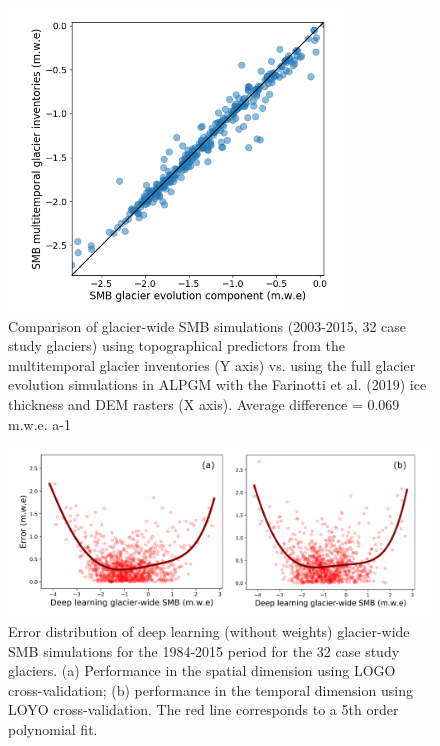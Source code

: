 \begin{figure}[h]
\centering
\includegraphics[width=9cm]{Figures/methods/Figure_S5.png}
\caption{Comparison of glacier-wide SMB simulations (2003-2015, 32 case study glaciers) using topographical predictors from the multitemporal glacier inventories (Y axis) vs. using the full glacier evolution simulations in ALPGM with the Farinotti et al. (2019) ice thickness and DEM rasters (X axis). Average difference = 0.069 m.w.e.  a-1}
\end{figure}

\begin{figure}[h]
\centering
\includegraphics[width=15cm]{Figures/methods/Figure_S6.png}
\caption{Error distribution of deep learning (without weights) glacier-wide SMB simulations for the 1984-2015 period for the 32 case study glaciers. (a) Performance in the spatial dimension using LOGO cross-validation; (b) performance in the temporal dimension using LOYO cross-validation. The red line corresponds to a 5th order polynomial fit. }
\end{figure}
 

